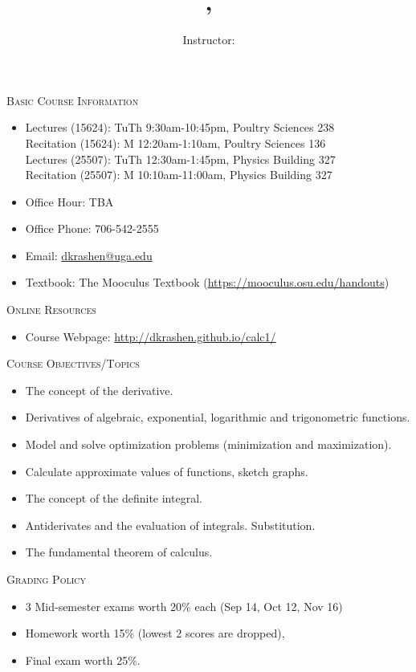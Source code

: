 \documentclass[12pt]{amsart}
\title{\course, \semester}
\author{Instructor: \instructor}
\makeatletter
\newcommand{\schedule}{
Lectures (15624): TuTh 9:30am-10:45pm, Poultry Sciences 238 \\
Recitation (15624): M 12:20am-1:10am, Poultry Sciences 136 \\
Lectures (25507): TuTh 12:30am-1:45pm, Physics Building 327 \\
Recitation (25507): M 10:10am-11:00am, Physics Building 327
}
\newcommand{\officehour}{Office Hour: TBA}
\newcommand{\phone}{706-542-2555}
\newcommand{\emailaddr}{dkrashen@uga.edu}
\newcommand{\textbook}{{The Mooculus Textbook}
(\url{https://mooculus.osu.edu/handouts})}
\newcommand{\website}{http://dkrashen.github.io/calc1/}
\makeatother
\begin{document}
\maketitle


\thispagestyle{empty}
\noindent
\textsc{Basic Course Information}

\begin{itemize}
\item
\schedule
\item 
\officehour
\item
Office Phone: \phone
\item
Email: \url{\emailaddr}
\item
Textbook: \textbook
\end{itemize}

\medskip

\noindent
\textsc{Online Resources}

\begin{itemize}
\item
Course Webpage:  
\url{\website} 
\end{itemize}

\medskip

\noindent
\textsc{Course Objectives/Topics}

\begin{itemize}
\item
The concept of the derivative.
\item
Derivatives of algebraic, exponential, logarithmic and trigonometric
functions.
\item
Model and solve optimization problems (minimization and
maximization).
\item
Calculate approximate values of functions, sketch graphs.
\item
The concept of the definite integral.
\item
Antiderivates and the evaluation of integrals. Substitution. 
\item
The fundamental theorem of calculus.
\end{itemize}

\medskip

\noindent
\textsc{Grading Policy}

\begin{itemize}
\item
3 Mid-semester exams worth 20\% each (Sep 14, Oct 12, Nov 16)
\item
Homework worth 15\% (lowest 2 scores are dropped), 
\item
Final exam worth 25\%.
\end{itemize}
\end{document}
